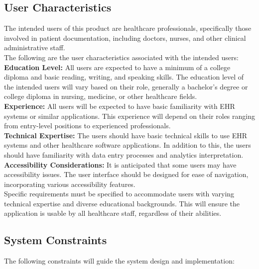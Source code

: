 \documentclass[12pt]{article}
\begin{document}
\subsection{User Characteristics} \label{sec_UserCharacteristics}

The intended users of this product are healthcare professionals, specifically those involved in patient documentation, including doctors, nurses, and other clinical administrative staff. \\

The following are the user characteristics associated with the intended users:\\

\textbf{Education Level:} All users are expected to have a minimum of a college diploma and basic reading, writing, and speaking skills. The education level of the intended users will vary based on their role, generally a bachelor’s degree or college diploma in nursing, medicine, or other healthcare fields. \\

\textbf{Experience:} All users will be expected to have basic familiarity with EHR systems or similar applications. This experience will depend on their roles ranging from entry-level positions to experienced professionals. \\

\textbf{Technical Expertise:} The users should have basic technical skills to use EHR systems and other healthcare software applications. In addition to this, the users should have familiarity with data entry processes and analytics interpretation. \\

\textbf{Accessibility Considerations:} It is anticipated that some users may have accessibility issues. The user interface should be designed for ease of navigation, incorporating various accessibility features.\\

Specific requirements must be specified to accommodate users with varying technical expertise and diverse educational backgrounds. This will ensure the application is usable by all healthcare staff, regardless of their abilities.


\subsection{System Constraints}

The following constraints will guide the system design and implementation:
\end{document}
